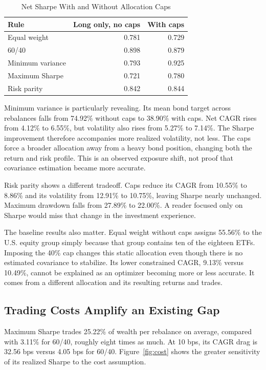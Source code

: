 \documentclass[conference]{IEEEtran}
\begin{document}
\begin{table}[t]
\caption{Net Sharpe With and Without Allocation Caps}
\label{tab:caps}
\centering
\small
\begin{tabular}{@{}lrr@{}}
\toprule
Rule & Long only, no caps & With caps \\
\midrule
Equal weight & 0.781 & 0.729 \\
60/40 & 0.898 & 0.879 \\
Minimum variance & 0.793 & 0.925 \\
Maximum Sharpe & 0.721 & 0.780 \\
Risk parity & 0.842 & 0.844 \\
\bottomrule
\end{tabular}
\end{table}

Minimum variance is particularly revealing. Its mean bond target across rebalances falls from 74.92\% without caps to 38.90\% with caps. Net CAGR rises from 4.12\% to 6.55\%, but volatility also rises from 5.27\% to 7.14\%. The Sharpe improvement therefore accompanies more realized volatility, not less. The caps force a broader allocation away from a heavy bond position, changing both the return and risk profile. This is an observed exposure shift, not proof that covariance estimation became more accurate.

Risk parity shows a different tradeoff. Caps reduce its CAGR from 10.55\% to 8.86\% and its volatility from 12.91\% to 10.75\%, leaving Sharpe nearly unchanged. Maximum drawdown falls from 27.89\% to 22.00\%. A reader focused only on Sharpe would miss that change in the investment experience.

The baseline results also matter. Equal weight without caps assigns 55.56\% to the U.S. equity group simply because that group contains ten of the eighteen ETFs. Imposing the 40\% cap changes this static allocation even though there is no estimated covariance to stabilize. Its lower constrained CAGR, 9.13\% versus 10.49\%, cannot be explained as an optimizer becoming more or less accurate. It comes from a different allocation and its resulting returns and trades.

\subsection{Trading Costs Amplify an Existing Gap}
Maximum Sharpe trades 25.22\% of wealth per rebalance on average, compared with 3.11\% for 60/40, roughly eight times as much. At 10 bps, its CAGR drag is 32.56 bps versus 4.05 bps for 60/40. Figure~\ref{fig:cost} shows the greater sensitivity of its realized Sharpe to the cost assumption.
\end{document}
